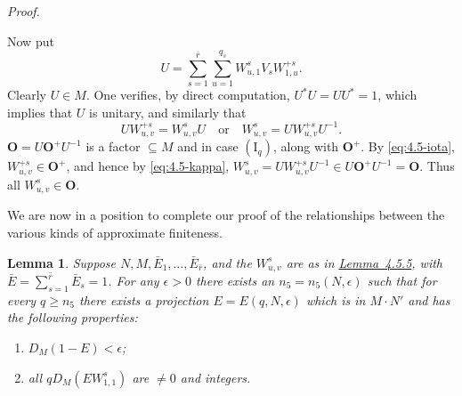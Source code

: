 \documentclass[b5paper,twoside]{article}
\newcommand{\lemref}[2]{\hyperref[#1]{\mbox{Lemma~#2}}}
\theoremstyle{mvnplain}
\newtheorem{lemma}{Lemma}[section]
\renewenvironment{proof}[1][Proof]{%
  \par\addvspace{0.35\baselineskip}%
  \noindent\textit{#1.}\ \normalfont\ignorespaces
}{%
  \par\addvspace{0.35\baselineskip}%
}
\newcommand{\M}{\mathbf M}
\newcommand{\N}{\mathbf N}
\def\M{M}%
\def\N{N}%
\begin{document}
\begin{proof}
Now put
\[
 U=\sum_{s=1}^{\bar r}\sum_{u=1}^{q_s}W^s_{u,1}V_sW^{+s}_{1,u}.
\]
Clearly \(U\in\M\). One verifies, by direct computation,
\(U^*U=UU^*=1\), which implies that \(U\) is unitary, and similarly that
\begin{equation}\tag{4.5.\(\kappa\)}\label{eq:4.5-kappa}
 UW^{+s}_{u,v}=W^s_{u,v}U
 \quad\text{or}\quad
 W^s_{u,v}=UW^{+s}_{u,v}U^{-1}.
\end{equation}
\(\mathbf O=U\mathbf O^+U^{-1}\) is a factor \(\subseteq\M\) and in case
\((\mathrm I_q)\), along with \(\mathbf O^+\). By \eqref{eq:4.5-iota},
\(W^{+s}_{u,v}\in\mathbf O^+\), and hence by \eqref{eq:4.5-kappa},
\(W^s_{u,v}=UW^{+s}_{u,v}U^{-1}\in U\mathbf O^+U^{-1}=\mathbf O\). Thus
all \(W^s_{u,v}\in\mathbf O\).
\end{proof}

We are now in a position to complete our proof of the relationships between the
various kinds of approximate finiteness.

\begin{lemma}\label{lem:4.6.1}
Suppose \(\N,\M,\bar E_1,\ldots,\bar E_{\bar r}\), and the
\(W^s_{u,v}\) are as in \lemref{lem:4.5.5}{4.5.5}, with
\(\bar E=\sum_{s=1}^{\bar r}\bar E_s=1\). For any \(\epsilon>0\) there
exists an \(n_5=n_5(\N,\epsilon)\) such that for every \(q\geq n_5\) there
exists a projection \(E=E(q,\N,\epsilon)\) which is in
\(\M\mathbin{\cdot}\N'\) and has the following properties:
\begin{enumerate}[label=(\roman*)]
\item \(D_{\M}(1-E)<\epsilon\);
\item all \(qD_{\M}(EW^s_{1,1})\) are \(\ne0\) and integers.
\end{enumerate}
\end{lemma}
\end{document}
